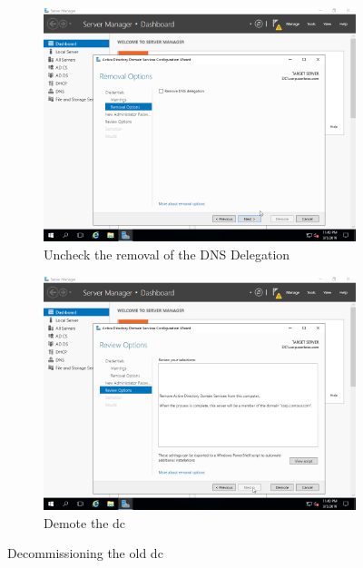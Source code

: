 \begin{figure}[!htb]\ContinuedFloat
	\begin{subfigure}{0.5\textwidth}
		\captionsetup{width=0.8\linewidth}
		\includegraphics[width=0.9\linewidth]{img/Methodologie/Migration33.png}
		\centering
		\caption{Uncheck the removal of the DNS Delegation}
	\end{subfigure}
	\begin{subfigure}{0.5\textwidth}
		\captionsetup{width=0.8\linewidth}
		\includegraphics[width=0.9\linewidth]{img/Methodologie/Migration34.png} 
		\centering	
		\caption{Demote the \acrshort{dc}}
	\end{subfigure}
	\caption[Decommissioning the \acrshort{dc}]{Decommissioning the old \acrshort{dc}}
	\label{fig:Decomissioning}
\end{figure}